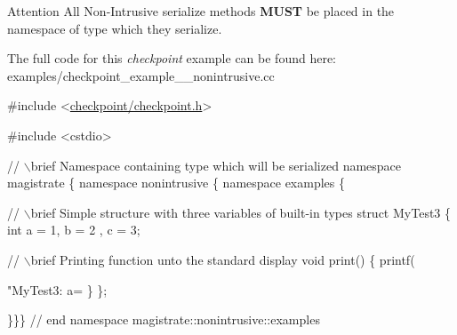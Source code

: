\begin{DoxyAttention}{Attention}
All Non-\/\+Intrusive serialize methods {\bfseries M\+U\+ST} be placed in the namespace of type which they serialize.
\end{DoxyAttention}
The full code for this {\itshape checkpoint} example can be found here\+: {\ttfamily examples/checkpoint\+\_\+example\+\_\+\_\+nonintrusive.\+cc}


\begin{DoxyCodeInclude}

\textcolor{preprocessor}{#include <\hyperlink{checkpoint_8h}{checkpoint/checkpoint.h}>}

\textcolor{preprocessor}{#include <cstdio>}

\textcolor{comment}{// \(\backslash\)brief Namespace containing type which will be serialized}
\textcolor{keyword}{namespace }magistrate \{ \textcolor{keyword}{namespace }nonintrusive \{ \textcolor{keyword}{namespace }examples \{

\textcolor{comment}{// \(\backslash\)brief Simple structure with three variables of built-in types}
\textcolor{keyword}{struct }MyTest3 \{
  \textcolor{keywordtype}{int} a = 1, b = 2 , c = 3;

  \textcolor{comment}{// \(\backslash\)brief Printing function unto the standard display}
  \textcolor{keywordtype}{void} print() \{
    printf(\textcolor{stringliteral}{"MyTest3: a=%
  \}
\};

\}\}\} \textcolor{comment}{// end namespace magistrate::nonintrusive::examples}

}
\end{DoxyCodeInclude}
